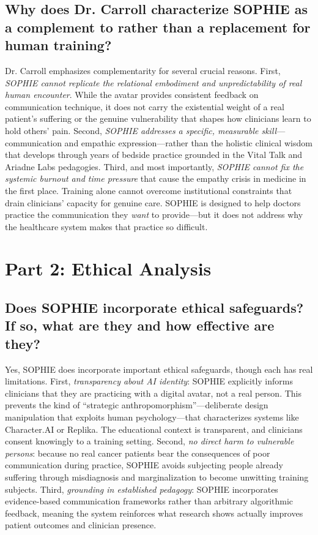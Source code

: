 \documentclass[12pt,twoside]{article}
\begin{document}
\subsection*{Why does Dr. Carroll characterize SOPHIE as a complement to rather than a replacement for human training?}

Dr. Carroll emphasizes complementarity for several crucial reasons. First, \emph{SOPHIE cannot replicate the relational embodiment and unpredictability of real human encounter}. While the avatar provides consistent feedback on communication technique, it does not carry the existential weight of a real patient's suffering or the genuine vulnerability that shapes how clinicians learn to hold others' pain. Second, \emph{SOPHIE addresses a specific, measurable skill}—communication and empathic expression—rather than the holistic clinical wisdom that develops through years of bedside practice grounded in the Vital Talk and Ariadne Labs pedagogies. Third, and most importantly, \emph{SOPHIE cannot fix the systemic burnout and time pressure} that cause the empathy crisis in medicine in the first place. Training alone cannot overcome institutional constraints that drain clinicians' capacity for genuine care. SOPHIE is designed to help doctors practice the communication they \emph{want} to provide—but it does not address why the healthcare system makes that practice so difficult.

\section*{Part 2: Ethical Analysis}

\subsection*{Does SOPHIE incorporate ethical safeguards? If so, what are they and how effective are they?}

Yes, SOPHIE does incorporate important ethical safeguards, though each has real limitations. First, \emph{transparency about AI identity}: SOPHIE explicitly informs clinicians that they are practicing with a digital avatar, not a real person. This prevents the kind of \enquote{strategic anthropomorphism}—deliberate design manipulation that exploits human psychology—that characterizes systems like Character.AI or Replika. The educational context is transparent, and clinicians consent knowingly to a training setting. Second, \emph{no direct harm to vulnerable persons}: because no real cancer patients bear the consequences of poor communication during practice, SOPHIE avoids subjecting people already suffering through misdiagnosis and marginalization to become unwitting training subjects. Third, \emph{grounding in established pedagogy}: SOPHIE incorporates evidence-based communication frameworks rather than arbitrary algorithmic feedback, meaning the system reinforces what research shows actually improves patient outcomes and clinician presence.
\end{document}
